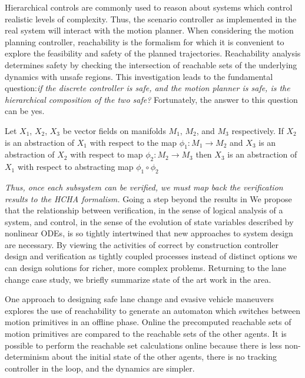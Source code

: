 Hierarchical controls are commonly used to reason about systems which control realistic levels of complexity. Thus, the scenario controller as implemented in the real system will interact with the motion planner. When considering the motion planning controller, reachability is the formalism for which it is convenient to explore the feasibility and safety of the planned trajectories. Reachability analysis determines safety by checking the intersection of reachable sets of the underlying dynamics with unsafe regions. This investigation leads to the fundamental question:{\it if the discrete controller is safe, and the motion planner is safe, is the hierarchical composition of the two safe?} Fortunately, the answer to this question can be yes. 

\begin{prop}
	Let \(X_1\), \(X_2\), \(X_3\) be vector fields on manifolds \(M_1\), \(M_2\), and \(M_3\) respectively. If \(X_2\) is an abstraction of \(X_1\) with respect to the map \(\phi_1 : M_1 \rightarrow M_2\) and \(X_3\) is an abstraction of \(X_2\) with respect to map \(\phi_2 : M_2 \rightarrow M_3\) then \(X_3\) is an abstraction of \(X_1\) with respect to abstracting map \(\phi_1 \circ \phi_2\) \cite{Pappas1998}
\end{prop}

{\it Thus, once each subsystem can be verified, we must map back the verification results to the HCHA formalism.}
Going a step beyond the results in \cite{Pappas1998} We propose that the relationship between verification, in the sense of logical analysis of a system, and control, in the sense of the evolution of state variables described by nonlinear ODEs, is so tightly intertwined that new approaches to system design are necessary. By viewing the activities of correct by construction controller design and verification as tightly coupled processes instead of distinct options we can design solutions for richer, more complex problems. Returning to the lane change case study, we briefly summarize state of the art work in the area.

One approach to designing safe lane change and evasive vehicle maneuvers explores the use of reachability to generate an automaton which switches between motion primitives in an offline phase. Online the precomputed reachable sets of motion primitives are compared to the reachable sets of the other agents. It is possible to perform the reachable set calculations online because there is less non-determinism about the initial state of the other agents, there is no tracking controller in the loop, and the dynamics are simpler.\cite{Hess2014}

